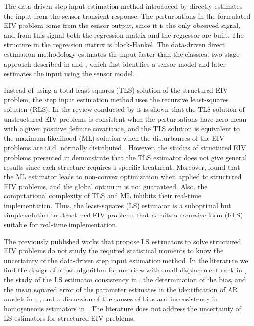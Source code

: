 The data-driven step input estimation method introduced by \citet{Markovsky15cep} directly estimates the input from the sensor transient response. 
The perturbations in the formulated EIV problem come from the sensor output, since it is the only observed signal, and from this signal both the regression matrix and the regressor are built.
The structure in the regression matrix is block-Hankel.
The data-driven direct estimation methodology  estimates the input faster than the classical two-stage approach described in \citet{Azam15} and \citet{Niedzwiecki16a}, which first identifies a sensor model and later estimates the input using the sensor model.

Instead of using a total least-squares (TLS) solution of the structured EIV problem, the step input estimation method uses the recursive least-squares solution (RLS). 
In the review conducted by \citet{Markovsky07overview} it is shown that the TLS solution of unstructured EIV problems is consistent when the perturbations have zero mean with a given positive definite covariance, and
the TLS solution is equivalent to the maximum likelihood (ML) solution when the disturbances of the EIV problems are i.i.d. normally distributed . 
However, the studies of structured EIV problems presented in \citet{VanHuffel07TLSeditorial} demonstrate that the TLS estimator does not give general results since each structure requires a specific treatment. 
Moreover, \citet{Rhode14recursive} found that the ML estimator leads to non-convex optimization when applied to structured EIV problems, and the global optimum is not guaranteed.
Also, the computational complexity of TLS and ML inhibits their real-time implementation.
Thus, the least-squares (LS) estimator is a suboptimal but simple solution to structured EIV problems that admits a recursive form (RLS) suitable for real-time implementation.

The previously published works that propose LS estimators to solve structured EIV problems do not study the required statistical moments to know the uncertainty of the data-driven step input estimation method.
In the literature we find 
the design of a fast algorithm for matrices with small displacement rank in \citet{Mastronardi07fast}, 
the study of the LS estimator consistency in \citet{Palanthandalam10parameter},
the determination of the bias, and the mean squared error of the parameter estimates in the identification of AR models in \citet{Kiviet12high}, \citet{Kiviet14improved}, and
a discussion of the causes of bias and inconsistency in homogeneous estimators in \citet{Yeredor04homogeneous}.
The literature does not address the uncertainty of LS estimators for structured EIV problems.


